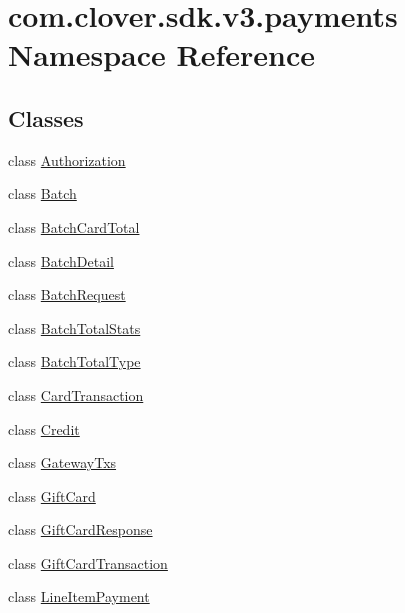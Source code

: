 \hypertarget{namespacecom_1_1clover_1_1sdk_1_1v3_1_1payments}{}\section{com.\+clover.\+sdk.\+v3.\+payments Namespace Reference}
\label{namespacecom_1_1clover_1_1sdk_1_1v3_1_1payments}
\subsection*{Classes}
\begin{DoxyCompactItemize}
\item 
class \hyperlink{classcom_1_1clover_1_1sdk_1_1v3_1_1payments_1_1_authorization}{Authorization}
\item 
class \hyperlink{classcom_1_1clover_1_1sdk_1_1v3_1_1payments_1_1_batch}{Batch}
\item 
class \hyperlink{classcom_1_1clover_1_1sdk_1_1v3_1_1payments_1_1_batch_card_total}{Batch\+Card\+Total}
\item 
class \hyperlink{classcom_1_1clover_1_1sdk_1_1v3_1_1payments_1_1_batch_detail}{Batch\+Detail}
\item 
class \hyperlink{classcom_1_1clover_1_1sdk_1_1v3_1_1payments_1_1_batch_request}{Batch\+Request}
\item 
class \hyperlink{classcom_1_1clover_1_1sdk_1_1v3_1_1payments_1_1_batch_total_stats}{Batch\+Total\+Stats}
\item 
class \hyperlink{classcom_1_1clover_1_1sdk_1_1v3_1_1payments_1_1_batch_total_type}{Batch\+Total\+Type}
\item 
class \hyperlink{classcom_1_1clover_1_1sdk_1_1v3_1_1payments_1_1_card_transaction}{Card\+Transaction}
\item 
class \hyperlink{classcom_1_1clover_1_1sdk_1_1v3_1_1payments_1_1_credit}{Credit}
\item 
class \hyperlink{classcom_1_1clover_1_1sdk_1_1v3_1_1payments_1_1_gateway_txs}{Gateway\+Txs}
\item 
class \hyperlink{classcom_1_1clover_1_1sdk_1_1v3_1_1payments_1_1_gift_card}{Gift\+Card}
\item 
class \hyperlink{classcom_1_1clover_1_1sdk_1_1v3_1_1payments_1_1_gift_card_response}{Gift\+Card\+Response}
\item 
class \hyperlink{classcom_1_1clover_1_1sdk_1_1v3_1_1payments_1_1_gift_card_transaction}{Gift\+Card\+Transaction}
\item 
class \hyperlink{classcom_1_1clover_1_1sdk_1_1v3_1_1payments_1_1_line_item_payment}{Line\+Item\+Payment}

\end{DoxyCompactItemize}
